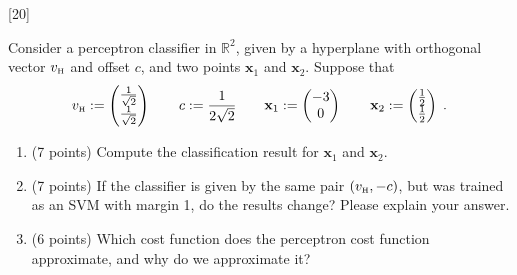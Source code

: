 \documentclass[]{../util/ColumbiaAssm}
\begin{document}
  \vspace{-2cm}

\AddSubmissionRules


  \vspace{0.5cm}

  \def\Rd{\mathbb{R}^d}
  \def\indH{\mbox{\tiny H}}
  \def\v{\mathbf{v}}
  \def\sign{\mbox{sgn}}
  \def\sp#1{\left< #1\right>}
  \def\train{\tilde{\x}}
  \def\trainlabel{\tilde{y}}
  \def\x{\mathbf{x}}
  \def\y{\mathbf{y}}
  \def\z{\mathbf{z}}


\begin{questions}


[20]
   
   \def\indH{\mbox{\tiny H}}
Consider a perceptron classifier in $\mathbb{R}^2$, given by a hyperplane with orthogonal vector $v_{\indH}$ and offset $c$, and two points
$\mathbf{x}_1$ and $\mathbf{x}_2$. Suppose that
\begin{equation*}
  v_{\indH}:=\left(\begin{matrix}\frac{1}{\sqrt{2}}\\\frac{1}{\sqrt{2}}\end{matrix}\right)
  \qquad
  c:=\frac{1}{2\sqrt{2}}
  \qquad
  \mathbf{x}_1:=\left(\begin{matrix}-3\\0\end{matrix}\right)
    \qquad
    \mathbf{x}_2:=\left(\begin{matrix}\frac{1}{2}\\\frac{1}{2}\end{matrix}\right) \;.
\end{equation*}
\begin{enumerate}
\item (7 points) Compute the classification result for ${\mathbf{x}_1}$ and
  ${\mathbf{x}_2}$.
\item (7 points) If the classifier is given by the same pair $(v_{\indH},-c)$, but was trained as an SVM with
  margin 1, do the results change? Please explain your answer.
\item (6 points) Which cost function does the perceptron cost function
  approximate, and why do we approximate it?
\end{enumerate}


\end{questions}
\end{document}
